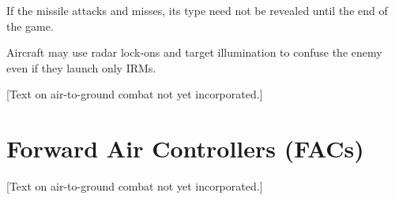 \begin{advancedrules}
{If the missile attacks and misses, its type need not be revealed until the end of the game.

Aircraft may use radar lock-ons and target illumination to confuse the enemy even if they launch only IRMs.
}

[Text on air-to-ground combat not yet incorporated.]

\iffalse

\paragraph{Ground Unit and Naval Unit Identification.} Ground and naval units, especially vehicles, seen from the air are hard to identify. To reflect this, always set up ground units and Naval units with their generic side up. Their exact type is not revealed unless visually identified or the instant they fire on aircraft or are attacked by aircraft.

Furthermore, generic AAA and SAM site counters (mobile and static types) may be provided which are placed on the map instead of the actual units. Only when a AAA or SAM unit fires for the first time, or the site is attacked, is the actual unit revealed and returned to the map in place of the silt marker. In some scenarios, dummy sites are provided, these are not revealed until attacked or I.D.'d.

\paragraph{I.D. Procedure.} Visual identification of ground and Naval units may occur before a unit is attacked or fires. Aircraft may attempt to visually I.D. targets in the sighting phase after sighting them. Roll once for each sighted unit in an aircraft's searched arc. If the number is less than or equal to 10 minus the range in hexes (counting 2 altitude levels as a hex), the unit is identified and flipped over to its non-generic side. Once a unit is identified through visual sighting or by attack or when it fires, it remains I.D.'d for the rest of the game.

\fi

\section{Forward Air Controllers (FACs)}
\label{rule:sighting-facs}

[Text on air-to-ground combat not yet incorporated.]


\end{advancedrules}
